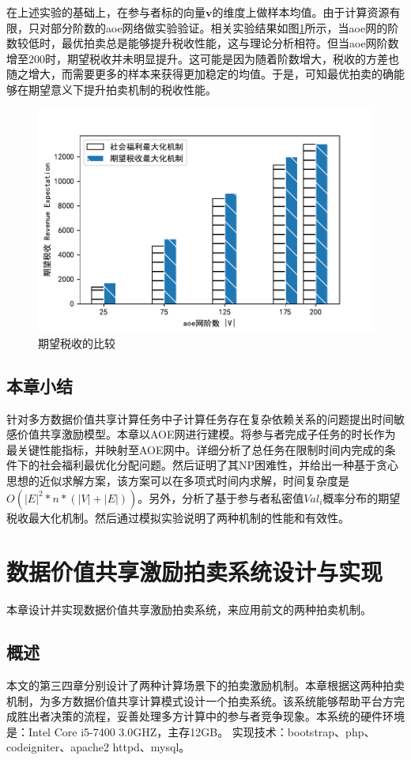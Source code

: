 \documentclass[promaster]{thesis-uestc}
\begin{document}
在上述实验的基础上，在参与者标的向量$\mathbf{v}$的维度上做样本均值。由于计算资源有限，只对部分阶数的aoe网络做实验验证。相关实验结果如图\ref{picc2}所示，当aoe网的阶数较低时，最优拍卖总是能够提升税收性能，这与理论分析相符。但当aoe网阶数增至200时，期望税收并未明显提升。这可能是因为随着阶数增大，税收的方差也随之增大，而需要更多的样本来获得更加稳定的均值。于是，可知最优拍卖的确能够在期望意义下提升拍卖机制的税收性能。

\begin{figure}[H]
    \includegraphics[width=325pt]{exp/expswandoptimal.pdf}
    \caption{期望税收的比较}
    \label{picc2}
\end{figure}

\FloatBarrier

\section{本章小结}

针对多方数据价值共享计算任务中子计算任务存在复杂依赖关系的问题提出时间敏感价值共享激励模型。本章以AOE网进行建模。将参与者完成子任务的时长作为最关键性能指标，并映射至AOE网中。详细分析了总任务在限制时间内完成的条件下的社会福利最优化分配问题。然后证明了其NP困难性，并给出一种基于贪心思想的近似求解方案，该方案可以在多项式时间内求解，时间复杂度是$O(|E|^2*n*(|V|+|E|))$。另外，分析了基于参与者私密值$Val_i$概率分布的期望税收最大化机制。然后通过模拟实验说明了两种机制的性能和有效性。


\chapter{数据价值共享激励拍卖系统设计与实现}
本章设计并实现数据价值共享激励拍卖系统，来应用前文的两种拍卖机制。
\section{概述}
本文的第三四章分别设计了两种计算场景下的拍卖激励机制。本章根据这两种拍卖机制，为多方数据价值共享计算模式设计一个拍卖系统。该系统能够帮助平台方完成胜出者决策的流程，妥善处理多方计算中的参与者竞争现象。本系统的硬件环境是：Intel Core i5-7400 3.0GHZ，主存12GB。
实现技术：bootstrap、php、codeigniter、apache2 httpd、mysql。
\end{document}
